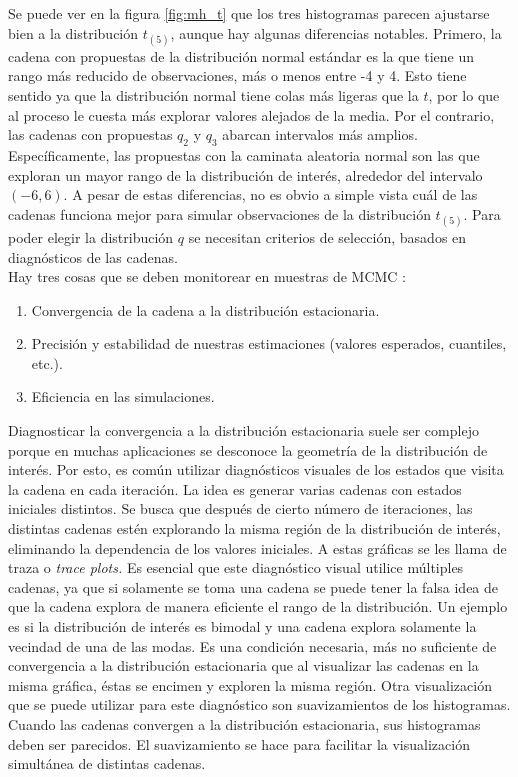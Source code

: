 \documentclass[11pt,a4paper]{article}
\begin{document}
Se puede ver en la figura \ref{fig:mh_t} que los tres histogramas parecen ajustarse bien a la distribución $t_{(5)}$, aunque hay algunas diferencias notables. Primero, la cadena con propuestas de la distribución normal estándar es la que tiene un rango más reducido de observaciones, más o menos entre -4 y 4. Esto tiene sentido ya que la distribución normal tiene colas más ligeras que la $t$, por lo que al proceso le cuesta más explorar valores alejados de la media. Por el contrario, las cadenas con propuestas $q_2$ y $q_3$ abarcan intervalos más amplios. Específicamente, las propuestas con la caminata aleatoria normal son las que exploran un mayor rango de la distribución de interés, alrededor del intervalo $(-6, 6)$. A pesar de estas diferencias, no es obvio a simple vista cuál de las cadenas funciona mejor para simular observaciones de la distribución $t_{(5)}$. Para poder elegir la distribución $q$ se necesitan criterios de selección, basados en diagnósticos de las cadenas.\\

Hay tres cosas que se deben monitorear en muestras de MCMC \citep{kruschke}:
\begin{enumerate}
\item Convergencia de la cadena a la distribución estacionaria.
\item Precisión y estabilidad de nuestras estimaciones (valores esperados, cuantiles, etc.).
\item Eficiencia en las simulaciones.\\
\end{enumerate}

Diagnosticar la convergencia a la distribución estacionaria suele ser complejo porque en muchas aplicaciones se desconoce la geometría de la distribución de interés. Por esto, es común utilizar diagnósticos visuales de los estados que visita la cadena en cada iteración. La idea es generar varias cadenas con estados iniciales distintos. Se busca que después de cierto número de iteraciones, las distintas cadenas estén explorando la misma región de la distribución de interés, eliminando la dependencia de los valores iniciales. A estas gráficas se les llama de traza o \textit{trace plots.} Es esencial que este diagnóstico visual utilice múltiples cadenas, ya que si solamente se toma una cadena se puede tener la falsa idea de que la cadena explora de manera eficiente el rango de la distribución. Un ejemplo es si la distribución de interés es bimodal y una cadena explora solamente la vecindad de una de las modas. Es una condición necesaria, más no suficiente de convergencia a la distribución estacionaria que al visualizar las cadenas en la misma gráfica, éstas se encimen y exploren la misma región. Otra visualización que se puede utilizar para este diagnóstico son suavizamientos de los histogramas. Cuando las cadenas convergen a la distribución estacionaria, sus histogramas deben ser parecidos. El suavizamiento se hace para facilitar la visualización simultánea de distintas cadenas.\\
\end{document}
